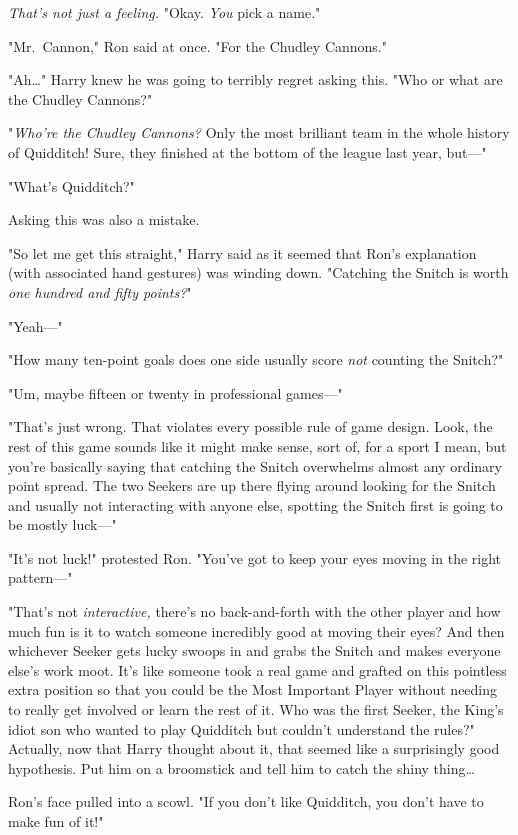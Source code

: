 \emph{That's not just a feeling.} "Okay. \emph{You} pick a name."

"Mr.~Cannon," Ron said at once. "For the Chudley Cannons."

"Ah{\ldots}" Harry knew he was going to terribly regret asking this. "Who or
what are the Chudley Cannons?"

"\emph{Who're the Chudley Cannons?} Only the most brilliant team in the whole
history of Quidditch! Sure, they finished at the bottom of the league last
year, but---"

"What's Quidditch?"

Asking this was also a mistake.

"So let me get this straight," Harry said as it seemed that Ron's explanation
(with associated hand gestures) was winding down. "Catching the Snitch is worth
\emph{one hundred and fifty points?}"

"Yeah---"

"How many ten-point goals does one side usually score \emph{not} counting the
Snitch?"

"Um, maybe fifteen or twenty in professional games---"

"That's just wrong. That violates every possible rule of game design. Look, the
rest of this game sounds like it might make sense, sort of, for a sport I mean,
but you're basically saying that catching the Snitch overwhelms almost any
ordinary point spread. The two Seekers are up there flying around looking for
the Snitch and usually not interacting with anyone else, spotting the Snitch
first is going to be mostly luck---"

"It's not luck!" protested Ron. "You've got to keep your eyes moving in the
right pattern---"

"That's not \emph{interactive,} there's no back-and-forth with the other player
and how much fun is it to watch someone incredibly good at moving their eyes?
And then whichever Seeker gets lucky swoops in and grabs the Snitch and makes
everyone else's work moot. It's like someone took a real game and grafted on
this pointless extra position so that you could be the Most Important Player
without needing to really get involved or learn the rest of it. Who was the
first Seeker, the King's idiot son who wanted to play Quidditch but couldn't
understand the rules?" Actually, now that Harry thought about it, that seemed
like a surprisingly good hypothesis. Put him on a broomstick and tell him to
catch the shiny thing{\ldots}

Ron's face pulled into a scowl. "If you don't like Quidditch, you don't have to
make fun of it!"

